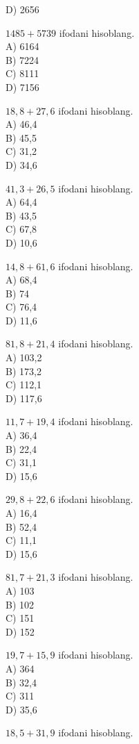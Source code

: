 D) 2656
  \item $1485+5739$ ifodani hisoblang.\\
A) 6164\\
B) 7224\\
C) 8111\\
D) 7156
  \item $18,8+27,6$ ifodani hisoblang.\\
A) 46,4\\
B) 45,5\\
C) 31,2\\
D) 34,6\\
  \item $41,3+26,5$ ifodani hisoblang.\\
A) 64,4\\
B) 43,5\\
C) 67,8\\
D) 10,6
  \item $14,8+61,6$ ifodani hisoblang.\\
A) 68,4\\
B) 74\\
C) 76,4\\
D) 11,6
  \item $81,8+21,4$ ifodani hisoblang.\\
A) 103,2\\
B) 173,2\\
C) 112,1\\
D) 117,6
  \item $11,7+19,4$ ifodani hisoblang.\\
A) 36,4\\
B) 22,4\\
C) 31,1\\
D) 15,6
  \item $29,8+22,6$ ifodani hisoblang.\\
A) 16,4\\
B) 52,4\\
C) 11,1\\
D) 15,6
  \item $81,7+21,3$ ifodani hisoblang.\\
A) 103\\
B) 102\\
C) 151\\
D) 152
  \item $19,7+15,9$ ifodani hisoblang.\\
A) 364\\
B) 32,4\\
C) 311\\
D) 35,6
  \item $18,5+31,9$ ifodani hisoblang.\\
